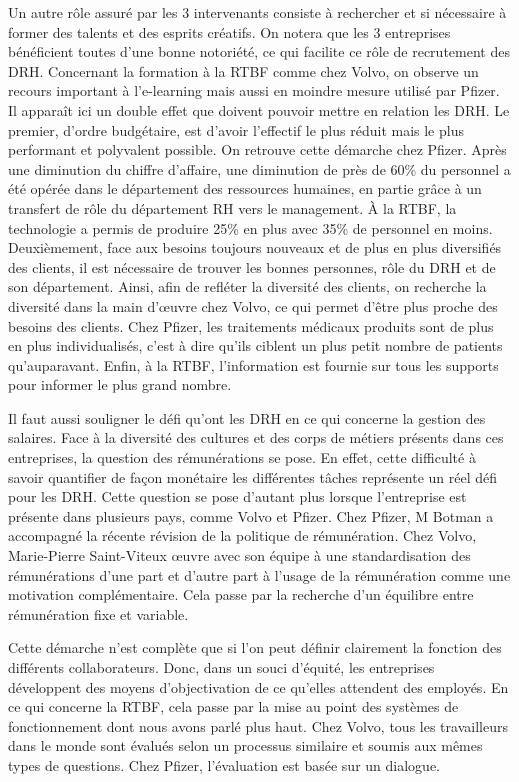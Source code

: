 \documentclass[a4paper, 12pt]{article}
\begin{document}
	Un autre rôle assuré par les 3 intervenants consiste à rechercher et si nécessaire à former des talents et des esprits créatifs. On notera que les 3 entreprises bénéficient toutes d'une bonne notoriété, ce qui facilite ce rôle de recrutement des DRH. Concernant la formation à la RTBF comme chez Volvo, on observe un recours important à l'e-learning mais aussi en moindre mesure utilisé par Pfizer. Il apparaît ici un double effet que doivent pouvoir mettre en relation les DRH. Le premier, d'ordre budgétaire, est d'avoir l'effectif le plus réduit mais le plus performant et polyvalent possible. On retrouve cette démarche chez Pfizer. Après une diminution du chiffre d'affaire, une diminution de près de 60\% du personnel a été opérée dans le département des ressources humaines, en partie grâce à un transfert de rôle du département RH vers le management. À la RTBF, la technologie a permis de produire 25\% en plus avec 35\% de personnel en moins. Deuxièmement, face aux besoins toujours nouveaux et de plus en plus diversifiés des clients, il est nécessaire de trouver les bonnes personnes, rôle du DRH et de son département. Ainsi, afin de refléter la diversité des clients, on recherche la diversité dans la main d'œuvre chez Volvo, ce qui permet d'être plus proche des besoins des clients. Chez Pfizer, les traitements médicaux produits sont de plus en plus individualisés, c'est à dire qu'ils ciblent un plus petit nombre de patients qu'auparavant. Enfin, à la RTBF, l'information est fournie sur tous les supports pour informer le plus grand nombre.	

Il faut aussi souligner le défi qu'ont les DRH en ce qui concerne la gestion des salaires. Face à la diversité des cultures et des corps de métiers présents dans ces entreprises, la question des rémunérations se pose. En effet, cette difficulté à savoir quantifier de façon monétaire les différentes tâches représente un réel défi pour les DRH. Cette question se pose d'autant plus lorsque l'entreprise est présente dans plusieurs pays, comme Volvo et Pfizer. Chez Pfizer, M Botman a accompagné la récente révision de la politique de rémunération. Chez Volvo, Marie-Pierre Saint-Viteux œuvre avec son équipe à une standardisation des rémunérations d'une part et d'autre part à l'usage de la rémunération comme une motivation complémentaire. Cela passe par la recherche d'un équilibre entre rémunération fixe et variable. 

Cette démarche n'est complète que si l'on peut définir clairement la fonction des différents collaborateurs. Donc, dans un souci d'équité, les entreprises développent des moyens d'objectivation de ce qu'elles attendent des employés. En ce qui concerne la RTBF, cela passe par la mise au point des systèmes de fonctionnement dont nous avons parlé plus haut. Chez Volvo, tous les travailleurs dans le monde sont évalués selon un processus similaire et soumis aux mêmes types de questions. Chez Pfizer, l'évaluation est basée sur un dialogue.
\end{document}
